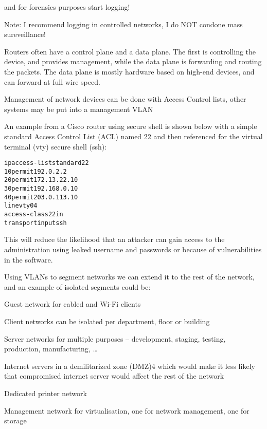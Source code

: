 \documentclass[Screen16to9,17pt]{foils}
\begin{document}
and for forensics purposes start logging!


Note: I recommend logging in controlled networks, I do NOT condone mass sureveillance!



Routers often have a control plane and a data plane. The first is controlling the device, and provides
management, while the data plane is forwarding and routing the packets. The data plane is mostly hardware based on high-end devices, and can forward at full wire speed.


Management of network devices can be done with Access Control lists, other systems may be put into a management VLAN

An example from a Cisco router using secure shell is shown below with a simple standard Access Control List (ACL) named 22 and then referenced for the virtual terminal (vty) secure shell (ssh):

\begin{alltt}\scriptsize
ip access-list standard 22
10 permit 192.0.2.2
20 permit 172.13.22.10
30 permit 192.168.0.10
40 permit 203.0.113.10
line vty 0 4
  access-class 22 in
  transport input ssh
\end{alltt}

This will reduce the likelihood that an attacker can gain access to the administration using leaked username and passwords or because of vulnerabilities in the software.


Using VLANs to segment networks we can extend it to the rest of the network, and an example of isolated segments could be:
\begin{list2}
\item Guest network for cabled and Wi-Fi clients
\item Client networks can be isolated per department, floor or building
\item Server networks for multiple purposes – development, staging, testing, production, manufacturing, …
\item Internet servers in a demilitarized zone (DMZ)4 which would make it less likely that compromised internet
server would affect the rest of the network
\item Dedicated printer network
\item Management network for virtualisation, one for network management, one for storage
\end{list2}
\end{document}
